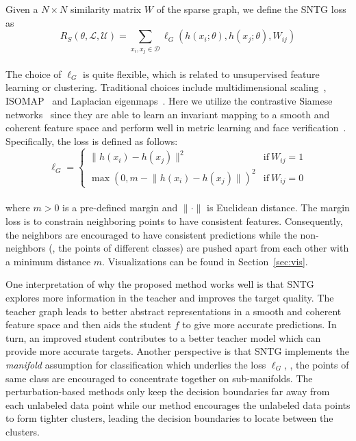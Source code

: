 \documentclass[10pt,twocolumn,letterpaper]{article}
\begin{document}
Given a $N\times N$ similarity matrix $W$ of the sparse graph, we define the SNTG loss as\\[-.2cm]
\begin{equation}
\label{equ:8}
R_{S}(\theta,\mathcal{L},\mathcal{U}) = \sum\limits_{x_i,x_j \in \mathcal{D}} \ell_G(h(x_i;\theta), h(x_j;\theta), W_{ij})
\end{equation}\\[-.2cm]
The choice of $\ell_G$ is quite flexible, which is related to unsupervised feature learning or clustering. Traditional choices include multidimensional scaling~\cite{cox2000multidimensional}, ISOMAP~\cite{tenenbaum2000global} and Laplacian eigenmaps~\cite{belkin2003laplacian}.
Here we utilize the contrastive Siamese networks~\cite{bromley1994signature} since they are able to learn an
invariant mapping to a smooth and coherent feature space and perform well in metric learning and face verification~\cite{hadsell2006dimensionality,chopra2005learning,taigman2014deepface}. Specifically, the loss is defined as follows:\\[-.2cm]
\begin{equation}
\label{marginloss}
\!\ell_G \!= \!\left \{ \begin{array}{ll}
\|h(x_i) - h(x_j) \|^2 							    & \text{if} ~ W_{ij} \!=\! 1\!\\
\max\left(0, m\! -\! \|h(x_i) - h(x_j) \|\right)^2	& \text{if} ~ W_{ij} \!=\! 0\!
\end{array}
\right .
\end{equation}\\[-.2cm]
where $m> 0$ is a pre-defined margin and $\|\cdot\|$ is Euclidean distance. The margin loss is to constrain neighboring points to have consistent features. Consequently, the neighbors are encouraged to have consistent predictions while the non-neighbors (\ie, the points of different classes) are pushed apart from each other with a minimum distance $m$. Visualizations can be found in Section~\ref{sec:vis}.

One interpretation of why the proposed method works well is that SNTG explores more information in the teacher and improves the target quality.
The teacher graph leads to better abstract representations in a smooth and coherent feature space and then aids the student $f$ to give more accurate predictions. In turn, an improved student contributes to a better teacher model which can provide more accurate targets.
Another perspective is that SNTG implements the \emph{manifold} assumption for classification which underlies the loss $\ell_G$, \ie, the points of same class are encouraged to concentrate together on sub-manifolds. The perturbation-based methods only keep the decision boundaries far away from each unlabeled data point while our method encourages the unlabeled data points to form tighter clusters, leading the decision boundaries to locate between the clusters.
\end{document}
